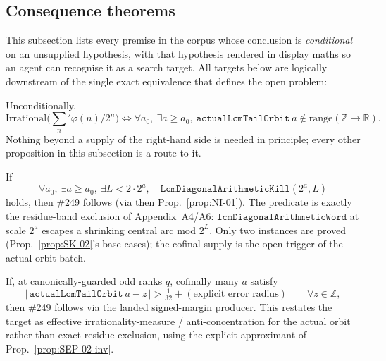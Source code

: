 \subsection{Consequence theorems}

This subsection lists every premise in the corpus whose conclusion is
\emph{conditional} on an unsupplied hypothesis, with that hypothesis rendered
in display maths so an agent can recognise it as a search target. All targets
below are logically downstream of the single exact equivalence that defines
the open problem:

\begin{prop}[The exact target: \#249 = cofinal actual-orbit nonintegrality]\label{prop:NI-01}
Unconditionally,
\[
\mathrm{Irrational}\Big(\textstyle\sum_n' \varphi(n)/2^n\Big)
\iff
\forall a_0,\ \exists a \ge a_0,\ \mathtt{actualLcmTailOrbit}\ a \notin \mathrm{range}(\mathbb{Z}\to\mathbb{R}).
\]
Nothing beyond a supply of the right-hand side is needed in principle; every
other proposition in this subsection is a route to it.
\ \ \\
\end{prop}

\begin{prop}\label{prop:AR-07}
If
\[
\forall a_0,\ \exists a\ge a_0,\ \exists L< 2\cdot 2^a,\quad \mathtt{LcmDiagonalArithmeticKill}(2^a,L)
\]
holds, then \#249 follows (via 
then Prop.~\ref{prop:NI-01}). The predicate is exactly the residue-band exclusion of
Appendix~A4/A6: $\mathtt{lcmDiagonalArithmeticWord}$ at scale $2^a$ escapes a shrinking
central arc mod $2^L$. Only two instances are proved (Prop.~\ref{prop:SK-02}'s base cases);
the cofinal supply is the open trigger of the actual-orbit batch.
\ \ \\
\end{prop}

\begin{prop}\label{prop:SEP-03}
If, at canonically-guarded odd ranks $q$, cofinally many $a$ satisfy
\[
\big|\,\mathtt{actualLcmTailOrbit}\ a - z\,\big| > \tfrac{1}{32} + (\text{explicit error radius}) \qquad \forall z\in\mathbb Z,
\]
then \#249 follows via the landed signed-margin producer. This restates the target as
effective irrationality-measure / anti-concentration for the actual orbit rather than
exact residue exclusion, using the explicit approximant of Prop.~\ref{prop:SEP-02-inv}.
\ \ \\
\end{prop}

